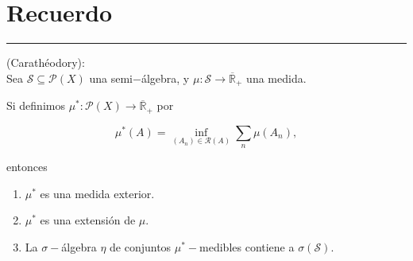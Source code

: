 \section{Recuerdo}
\hrule

\myteo (Carathéodory):\\
Sea \(\mathcal{S}\subseteq \mathcal{P}(X)\) una semi\(-\)álgebra, y 
\(\mu: \mathcal{S} \rightarrow \overline{\mathbb{R}}_+\) una medida. 

Si definimos \(\mu^*: \mathcal{P}(X)\rightarrow \overline{\mathbb{R}}_+\) por

\[
\mu^*(A) = \inf_{(A_n) \in \mathcal{R}(A)} \sum_n \mu(A_n),
\]

entonces
\begin{enumerate}[label=\roman*.]
    \item \(\mu^*\) es una medida exterior.
    \item \(\mu^*\) es una extensión de \(\mu\).
    \item La \(\sigma-\)álgebra \(\eta\) de conjuntos \(\mu^*-\)medibles contiene a
    \(\sigma(\mathcal{S})\).
\end{enumerate}
